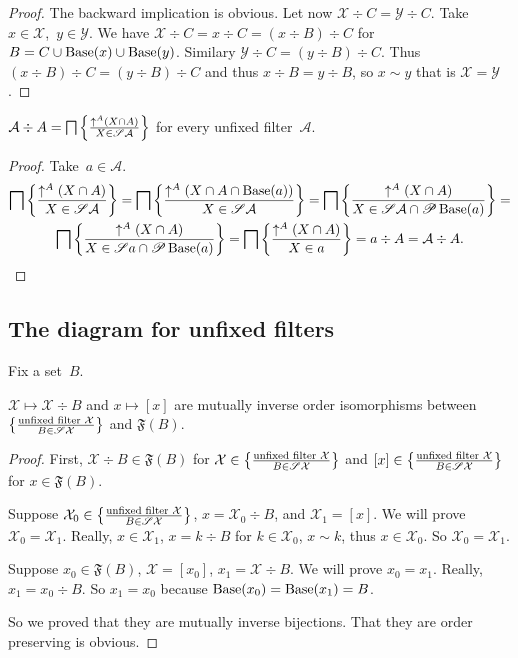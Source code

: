 \begin{proof}
The backward implication is obvious. Let now
$\mathcal{X}\div C=\mathcal{Y}\div C$.
Take~$x\in\mathcal{X}$,~$y\in\mathcal{Y}$.
We have
$\mathcal{X}\div C=x\div C=(x\div B)\div C$
for $B=C\cup\operatorname{Base}(x)\cup\operatorname{Base}(y)$.
Similary $\mathcal{Y}\div C=(y\div B)\div C$.
Thus $(x\div B)\div C=(y\div B)\div C$ and thus
$x\div B=y\div B$, so $x\sim y$ that is
$\mathcal{X}=\mathcal{Y}$.
\end{proof}

\begin{prop}
$\mathcal{A}\div A =
\bigsqcap\left\{ \frac{\uparrow^A(X\cap A)}{X\in\mathscr{S}\mathcal{A}}\right\}$ for every unfixed filter~$\mathcal{A}$.
\end{prop}

\begin{proof}
Take~$a\in\mathcal{A}$.
\begin{multline*}
\bigsqcap\left\{ \frac{\uparrow^A(X\cap A)}{X\in\mathscr{S}\mathcal{A}}\right\} =
\bigsqcap\left\{ \frac{\uparrow^A(X\cap A\cap\operatorname{Base}(a))}{X\in\mathscr{S}\mathcal{A}}\right\} =
\bigsqcap\left\{ \frac{\uparrow^A(X\cap A)}{X\in\mathscr{S}\mathcal{A}\cap\mathscr{P}\operatorname{Base}(a)}\right\} = \\
\bigsqcap\left\{ \frac{\uparrow^A(X\cap A)}{X\in\mathscr{S}a\cap\mathscr{P}\operatorname{Base}(a)}\right\} =
\bigsqcap\left\{ \frac{\uparrow^A(X\cap A)}{X\in a}\right\}=
a\div A = \mathcal{A}\div A.
\end{multline*}
\end{proof}

\subsection{The diagram for unfixed filters}

Fix a set~$B$.

\begin{lem}
$\mathcal{X}\mapsto\mathcal{X}\div B$ and $x\mapsto[x]$ are
mutually inverse order isomorphisms between
$\left\{ \frac{\text{unfixed filter }\mathcal{X}}{B\in\mathscr{S}\mathcal{X}}\right\}$ and $\mathfrak{F}(B)$.
\end{lem}

\begin{proof}
First, $\mathcal{X}\div B\in\mathfrak{F}(B)$ for
$\mathcal{X}\in\left\{ \frac{\text{unfixed filter }\mathcal{X}}{B\in\mathscr{S}\mathcal{X}}\right\}$ and
$[x]\in\left\{ \frac{\text{unfixed filter }\mathcal{X}}{B\in\mathscr{S}\mathcal{X}}\right\}$
for $x\in\mathfrak{F}(B)$.

Suppose $\mathcal{X}_0\in\left\{ \frac{\text{unfixed filter }\mathcal{X}}{B\in\mathscr{S}\mathcal{X}}\right\}$,
$x=\mathcal{X}_0\div B$, and $\mathcal{X}_1=[x]$. We will prove
$\mathcal{X}_0=\mathcal{X}_1$. Really, $x\in\mathcal{X}_1$,
$x=k\div B$ for $k\in\mathcal{X}_0$, $x\sim k$, thus
$x\in\mathcal{X}_0$. So $\mathcal{X}_0=\mathcal{X}_1$.

Suppose $x_0\in\mathfrak{F}(B)$, $\mathcal{X}=[x_0]$,
$x_1=\mathcal{X}\div B$. We will prove $x_0=x_1$. Really,
$x_1=x_0\div B$. So $x_1=x_0$ because
$\operatorname{Base}(x_0)=\operatorname{Base}(x_1)=B$.

So we proved that they are mutually inverse bijections. That
they are order preserving is obvious.
\end{proof}

